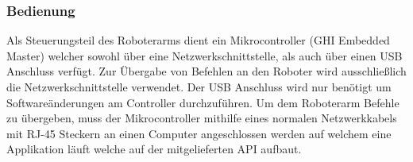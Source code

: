\subsubsection{Bedienung}
Als Steuerungsteil des Roboterarms dient ein Mikrocontroller (GHI Embedded Master) welcher sowohl über eine Netzwerkschnittstelle, als auch über einen USB Anschluss verfügt. Zur Übergabe von Befehlen an den Roboter wird ausschließlich die Netzwerkschnittstelle verwendet. Der USB Anschluss  wird nur benötigt um Softwareänderungen am Controller durchzuführen.
Um dem Roboterarm Befehle zu übergeben, muss der Mikrocontroller mithilfe eines normalen Netzwerkkabels mit RJ-45 Steckern an einen Computer angeschlossen werden auf welchem eine Applikation läuft welche auf der mitgelieferten API aufbaut.